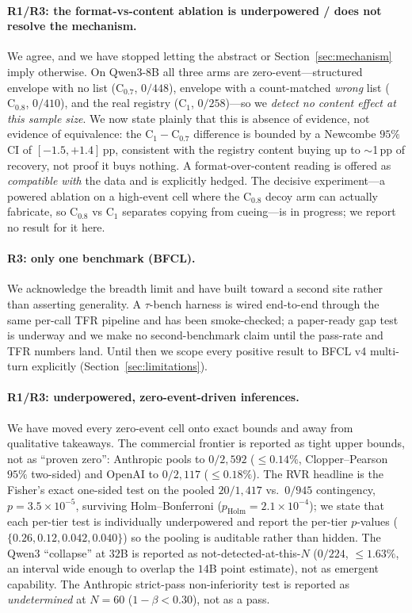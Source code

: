 \paragraph{R1/R3: the format-vs-content ablation is underpowered / does
not resolve the mechanism.}
We agree, and we have stopped letting the abstract or
Section~\ref{sec:mechanism} imply otherwise. On Qwen3-8B all three arms
are zero-event---structured envelope with no list ($\mathrm{C}_{0.7}$,
$0/448$), envelope with a count-matched \emph{wrong} list
($\mathrm{C}_{0.8}$, $0/410$), and the real registry ($\mathrm{C}_1$,
$0/258$)---so we \emph{detect no content effect at this sample size}. We
now state plainly that this is absence of evidence, not evidence of
equivalence: the $\mathrm{C}_1\!-\!\mathrm{C}_{0.7}$ difference is bounded
by a Newcombe $95\%$ CI of $[-1.5,+1.4]$\,pp, consistent with the registry
content buying up to $\sim$1\,pp of recovery, not proof it buys nothing. A
format-over-content reading is offered as \emph{compatible with} the data
and is explicitly hedged. The decisive experiment---a powered ablation on
a high-event cell where the $\mathrm{C}_{0.8}$ decoy arm can actually
fabricate, so $\mathrm{C}_{0.8}$ vs $\mathrm{C}_1$ separates copying from
cueing---is in progress; we report no result for it here.

\paragraph{R3: only one benchmark (BFCL).}
We acknowledge the breadth limit and have built toward a second site
rather than asserting generality. A $\tau$-bench harness is wired
end-to-end through the same per-call TFR pipeline and has been
smoke-checked; a paper-ready gap test is underway and we make no
second-benchmark claim until the pass-rate and TFR numbers land. Until
then we scope every positive result to BFCL v4 multi-turn explicitly
(Section~\ref{sec:limitations}).

\paragraph{R1/R3: underpowered, zero-event-driven inferences.}
We have moved every zero-event cell onto exact bounds and away from
qualitative takeaways. The commercial frontier is reported as tight upper
bounds, not as ``proven zero'': Anthropic pools to $0/2{,}592$
($\leq\!0.14\%$, Clopper--Pearson $95\%$ two-sided) and OpenAI to
$0/2{,}117$ ($\leq\!0.18\%$). The RVR headline is the Fisher's exact
one-sided test on the pooled $20/1{,}417$ vs.\ $0/945$ contingency,
$p\!=\!3.5\!\times\!10^{-5}$, surviving Holm--Bonferroni
($p_{\mathrm{Holm}}\!=\!2.1\!\times\!10^{-4}$); we state that each per-tier
test is individually underpowered and report the per-tier $p$-values
($\{0.26,0.12,0.042,0.040\}$) so the pooling is auditable rather than
hidden. The Qwen3 ``collapse'' at $32$B is reported as
not-detected-at-this-$N$ ($0/224$, $\leq\!1.63\%$, an interval wide enough
to overlap the $14$B point estimate), not as emergent capability. The
Anthropic strict-pass non-inferiority test is reported as
\emph{undetermined} at $N\!=\!60$ ($1\!-\!\beta\!<\!0.30$), not as a pass.

